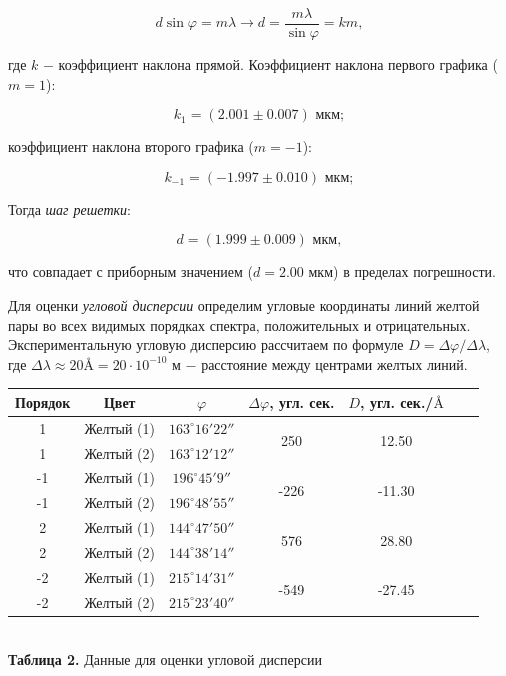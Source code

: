 \documentclass[a4paper,12pt]{article} %
\begin{document}
$$
d \sin{\varphi} = m \lambda \rightarrow d = \frac{m\lambda}{\sin{\varphi}} = km,
$$

\hfill \break где $k$ $-$ коэффициент наклона прямой. Коэффициент наклона первого графика ($m = 1$):

$$
k_{1} = (2.001 \pm 0.007) \text{ мкм};
$$

\hfill \break коэффициент наклона второго графика ($m = -1$):

$$
k_{-1} = (-1.997 \pm 0.010) \text{ мкм};
$$

\hfill \break Тогда \textit{шаг решетки}:

$$
d = (1.999 \pm 0.009) \text{ мкм},
$$

\hfill \break что совпадает с приборным значением ($d = 2.00 \text{ мкм}$) в пределах погрешности.

\hfill \break Для оценки \textit{угловой дисперсии} определим угловые координаты линий желтой пары во всех видимых порядках спектра, положительных и отрицательных. Экспериментальную угловую дисперсию рассчитаем по формуле $D = \Delta \varphi / \Delta \lambda$, где $\Delta \lambda \approx 20 \text{\AA} = 20 \cdot 10^{-10} \text{ м}$ $-$ расстояние между центрами желтых линий. 

\begin{center}
\begin{tabular}{|c|c|c|c|c|c|c|}\hline
Порядок & Цвет & $ \varphi $ & $ \Delta \varphi $, угл. сек. & $ D $, угл. сек./$ \text{\AA} $ \\\hline
1 & Желтый (1) & $163^\circ16'22''$ & \multirow{2}{*}{250} & \multirow{2}{*}{12.50} \\\cline{1 -3}
1 & Желтый (2) & $163^\circ12'12''$ & \multirow{2}{*}{} & \multirow{2}{*}{} \\\hline
-1 & Желтый (1) & $196^\circ45'9''$ & \multirow{2}{*}{-226} & \multirow{2}{*}{-11.30} \\\cline{1 -3}
-1 & Желтый (2) & $196^\circ48'55''$ & \multirow{2}{*}{} & \multirow{2}{*}{} \\\hline
2 & Желтый (1) & $144^\circ47'50''$ & \multirow{2}{*}{576} & \multirow{2}{*}{28.80} \\\cline{1 -3}
2 & Желтый (2) & $144^\circ38'14''$ & \multirow{2}{*}{} & \multirow{2}{*}{} \\\hline
-2 & Желтый (1) & $215^\circ14'31''$ & \multirow{2}{*}{-549} & \multirow{2}{*}{-27.45} \\\cline{1 -3}
-2 & Желтый (2) & $215^\circ23'40''$ & \multirow{2}{*}{} & \multirow{2}{*}{} \\\hline
\end{tabular} \\
\hfill \break \textbf {Таблица 2.} Данные для оценки угловой дисперсии\\
\end{center}
\end{document}
